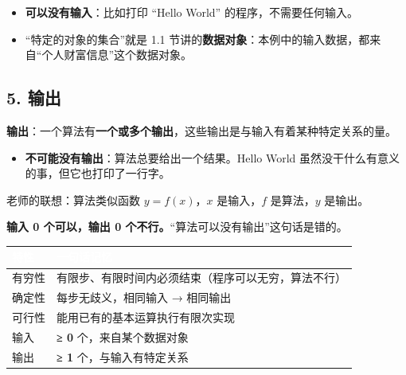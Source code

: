 \documentclass[10.5pt,a4paper,oneside]{article}
\newcommand{\hlred}[1]{\textcolor{wdred}{\bfseries #1}}
\providecommand{\tightlist}{\setlength{\itemsep}{2pt}\setlength{\parskip}{0pt}}
\begin{document}
\begin{itemize}
\tightlist
\item
  \textbf{可以没有输入}：比如打印 “Hello World” 的程序，不需要任何输入。
\item
  “特定的对象的集合”就是 1.1
  节讲的\textbf{数据对象}：本例中的输入数据，都来自“个人财富信息”这个数据对象。
\end{itemize}

\hypertarget{ux8f93ux51fa}{%
\subsection{5. 输出}\label{ux8f93ux51fa}}

\begin{defbox}

\textbf{输出}：一个算法有\hlred{一个或多个输出}，这些输出是与输入有着某种特定关系的量。

\end{defbox}

\begin{itemize}
\tightlist
\item
  \textbf{不可能没有输出}：算法总要给出一个结果。Hello World
  虽然没干什么有意义的事，但它也打印了一行字。
\end{itemize}

老师的联想：算法类似函数 \(y=f(x)\)，\(x\) 是输入，\(f\) 是算法，\(y\)
是输出。

\begin{pitfallbox}

\textbf{输入 0 个可以，输出 0 个不行。}“算法可以没有输出”这句话是错的。

\end{pitfallbox}

{
\begin{xltabular}{\linewidth}{>{\hsize\raggedright\arraybackslash}X>{\hsize\raggedright\arraybackslash}X}
\textcolor{white}{\bfseries 特性} & \textcolor{white}{\bfseries 一句话记忆} \\
\endfirsthead
有穷性 & 有限步、有限时间内必须结束（程序可以无穷，算法不行） \\ \hline
确定性 & 每步无歧义，相同输入 → 相同输出 \\ \hline
可行性 & 能用已有的基本运算执行有限次实现 \\ \hline
输入 & \textbf{≥ 0} 个，来自某个数据对象 \\ \hline
输出 & \textbf{≥ 1} 个，与输入有特定关系 \\ \hline
\end{xltabular}\par\vspace{4pt}}
\end{document}
